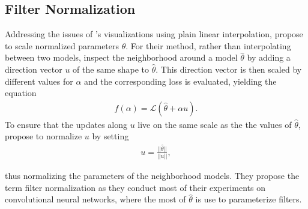 \documentclass[a4paper]{scrartcl}
\begin{document}
\subsection*{Filter Normalization}
Addressing the issues of \citet{goodfellow2014qualitatively}'s visualizations using plain linear interpolation, \citet{li2017visualizing} propose to scale normalized parameters $\theta$. For their method, rather than interpolating between two models, inspect the neighborhood around a model $\hat{\theta}$ by adding a direction vector $u$  of the same shape to $\hat{\theta}$. This direction vector is then scaled by different values for $\alpha$ and the corresponding loss is evaluated, yielding the equation
\begin{align*}
	f(\alpha) = \mathcal{L}(\hat{\theta} + \alpha u).
\end{align*}
To ensure that the updates along $u$ live on the same scale as the the values of $\hat{\theta}$, \citet{li2017visualizing} propose to normalize $u$ by setting
\begin{align}
	u = \frac{||\hat{\theta}||}{||u||},
\end{align}

thus normalizing the parameters of the neighborhood models. They propose the term filter normalization as they conduct most of their experiments on convolutional neural networks, where the most of $\hat{\theta}$ is use to parameterize filters.\\
\end{document}
